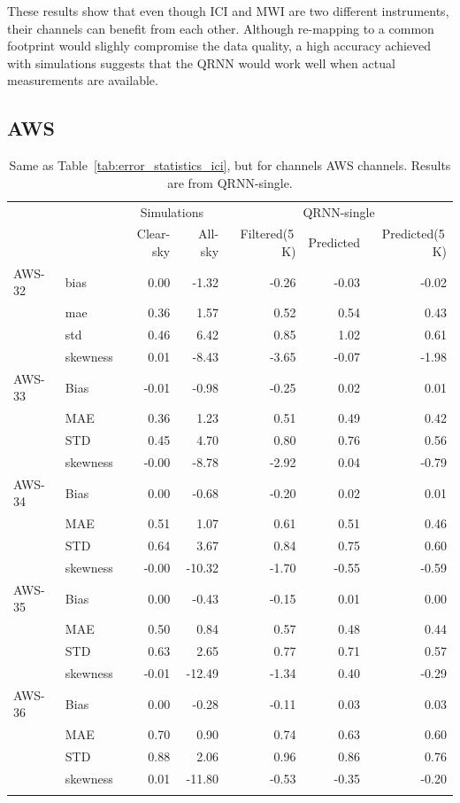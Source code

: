 \documentclass[amt, manuscript]{copernicus}
\begin{document}
These results show that even though ICI and MWI are two different instruments, their channels can benefit from each other. Although re-mapping to a common footprint would slighly compromise the data quality, a high accuracy achieved with simulations suggests that the QRNN would work well when actual measurements are available.

\subsection{AWS}
%
\begin{table}[t]
	\caption{Same as Table~\ref{tab:error_statistics_ici}, but for channels AWS channels. Results are from QRNN-single. }
	\label{tab:statistics_qrnn_aws}
	\begin{tabular}{llrr|rrr}
		\tophline
		&&\multicolumn{2}{c|}{Simulations}& \multicolumn{3}{c}{QRNN-single} \\
		\cline{3-7}
		&&   Clear-sky &   All-sky &  Filtered(5\,K) & Predicted & Predicted(5\,K) \\
		\middlehline
		AWS-32  &bias     & 0.00 & -1.32 & -0.26 & -0.03 & -0.02 \\
				&mae      & 0.36 &  1.57 &  0.52 &  0.54 &  0.43 \\
				&std      & 0.46 &  6.42 &  0.85 &  1.02 &  0.61 \\
				&skewness & 0.01 & -8.43 & -3.65 & -0.07 & -1.98 \\
		\middlehline
		AWS-33	&Bias     & -0.01 & -0.98 & -0.25 & 0.02 &  0.01 \\
				&MAE      &  0.36 &  1.23 &  0.51 & 0.49 &  0.42 \\
				&STD      &  0.45 &  4.70 &  0.80 & 0.76 &  0.56 \\
				&skewness & -0.00 & -8.78 & -2.92 & 0.04 & -0.79 \\
		
		\middlehline
		AWS-34	&Bias     &  0.00 &  -0.68 & -0.20 &  0.02 &  0.01 \\
				&MAE      &  0.51 &   1.07 &  0.61 &  0.51 &  0.46 \\
				&STD      &  0.64 &   3.67 &  0.84 &  0.75 &  0.60 \\
				&skewness & -0.00 & -10.32 & -1.70 & -0.55 & -0.59 \\
		\middlehline
		AWS-35	&Bias     &  0.00 &  -0.43 & -0.15 & 0.01 &  0.00 \\
				&MAE      &  0.50 &   0.84 &  0.57 & 0.48 &  0.44 \\
				&STD      &  0.63 &   2.65 &  0.77 & 0.71 &  0.57 \\
				&skewness & -0.01 & -12.49 & -1.34 & 0.40 & -0.29 \\
		\middlehline
		AWS-36  &Bias     & 0.00 &  -0.28 & -0.11 &  0.03 &  0.03 \\
				&MAE      & 0.70 &   0.90 &  0.74 &  0.63 &  0.60 \\
				&STD      & 0.88 &   2.06 &  0.96 &  0.86 &  0.76 \\
				&skewness & 0.01 & -11.80 & -0.53 & -0.35 & -0.20 \\
		\bottomhline				
	\end{tabular}
	\belowtable{} %
\end{table}
\end{document}
